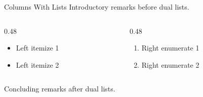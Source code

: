 \documentclass[14pt,t]{beamer-accessibility}
\begin{document}
\begin{frame}{Columns With Lists}
Introductory remarks before dual lists.

\begin{columns}[T]
\begin{column}{0.48\textwidth}
\begin{itemize}
\item Left itemize 1
\item Left itemize 2
\end{itemize}
\end{column}
\begin{column}{0.48\textwidth}
\begin{enumerate}
\item Right enumerate 1
\item Right enumerate 2
\end{enumerate}
\end{column}
\end{columns}

Concluding remarks after dual lists.
\end{frame}
\end{document}
